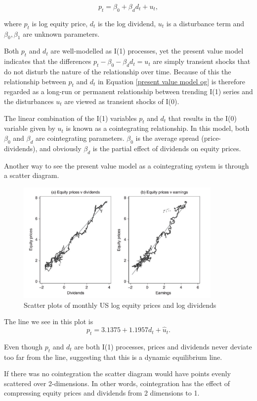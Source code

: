 \documentclass[11pt]{article}
\begin{document}
\begin{equation}
    \label{present value model og}
    p_t = \beta_0 + \beta_d d_t + u_t,
\end{equation}

where $p_t$ is log equity price, $d_t$ is the log dividend, $u_t$ is a disturbance term and $\beta_0,\beta_1$ are unknown parameters.

Both $p_t$ and $d_t$ are well-modelled as I(1) processes, yet the present value model indicates that the differences $p_t - \beta_0 - \beta_d d_t = u_t$ are simply transient shocks that do not disturb the nature of the relationship over time. Because of this the relationship between $p_t$ and $d_t$ in Equation \eqref{present value model og} is therefore regarded as a long-run or permanent relationship between trending I(1) series and the disturbances $u_t$ are viewed as transient shocks of I(0).

The linear combination of the I(1) variables $p_t$ and $d_t$ that results in the I(0) variable given by $u_t$ is known as a cointegrating relationship. In this model, both $\beta_0$ and $\beta_d$ are cointegrating parameters. $\beta_0$ is the average spread (price-dividends), and obviously $\beta_d$ is the partial effect of dividends on equity prices.

Another way to see the present value model as a cointegrating system is through a scatter diagram.
\begin{figure}[h]
    \centering
    \includegraphics[width=10cm]{pics/price dividends scatter.png}
    \caption{Scatter plots of monthly US log equity prices and log dividends}
    \label{fig:equity dividends scatter}
\end{figure}

The line we see in this plot is
\[p_t = 3.1375 + 1.1957 d_t + \hat{u}_t.\]

Even though $p_t$ and $d_t$ are both I(1) processes, prices and dividends never deviate too far from the line, suggesting that this is a dynamic equilibrium line.
\begin{note}
    If there was no cointegration the scatter diagram would have points evenly scattered over 2-dimensions. In other words, cointegration has the effect of compressing equity prices and dividends from 2 dimensions to 1.
\end{note}
\end{document}
